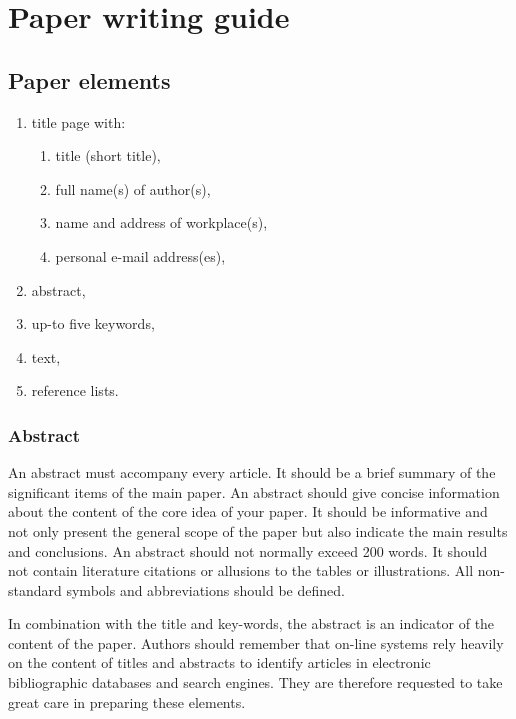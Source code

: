 \documentclass[USenglish,oneside,twocolumn]{article}
\begin{document}

\section{Paper writing guide}

\subsection{Paper elements}

\begin{enumerate}
\item title page with:
    \begin{enumerate}
    \item title (short title),
    \item full name(s) of author(s),
    \item name and address of workplace(s),
    \item personal e-mail address(es),
    \end{enumerate}
\item abstract,
\item up-to five keywords,
\item text,
\item reference lists.
\end{enumerate}


\subsubsection{Abstract}

An abstract must accompany every article. It should be a brief summary of the significant items of the main paper. An abstract should give concise information about the content of the core idea of your paper. It should be informative and not only present the general scope of the paper but also indicate the main results and conclusions. An abstract should not normally exceed 200 words. It should not contain literature citations or allusions to the tables or illustrations. All non-standard symbols and abbreviations should be defined.

In combination with the title and key-words, the abstract is an indicator of the content of the paper. Authors should remember that on-line systems rely heavily on the content of titles and abstracts to identify articles in electronic bibliographic databases and search engines. They are therefore requested to take great care in preparing these elements.
\end{document}
